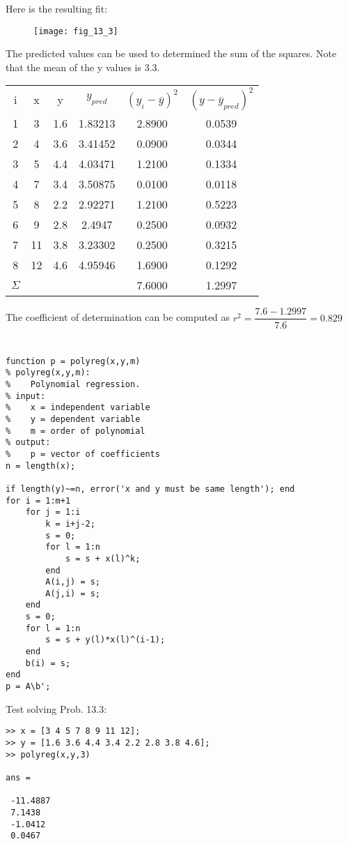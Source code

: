 \documentclass[../main.tex]{subfiles}
\begin{document}
	\bigbreak
Here is the resulting fit: 
	\bigbreak
	\begin{figure}[H]
		\texttt{[image: fig\_13\_3]}
		\label{fig:fig_13_3}
	\end{figure}
	\bigbreak
The predicted values can be used to determined the sum of the squares. Note that the mean
of the y values is 3.3.
	\bigbreak
	\begin{tabular}{cccccc}
	i&x&y&$y_{pred}$&$(y_i-\overline{y})^2$&$(y-\overline{y}_{pred})^2$\\
	1&3&1.6&1.83213&2.8900&0.0539\\
	2&4&3.6&3.41452&0.0900&0.0344\\
	3&5&4.4&4.03471&1.2100&0.1334\\
	4&7&3.4&3.50875&0.0100&0.0118\\
	5&8&2.2&2.92271&1.2100&0.5223\\
	6&9&2.8&2.4947&0.2500&0.0932\\
	7&11&3.8&3.23302&0.2500&0.3215\\
	8&12&4.6&4.95946&1.6900&0.1292\\
	$\Sigma$&&&&7.6000&1.2997\\
	\end{tabular}
	\bigbreak
The coefficient of determination can be computed as
	\bigbreak
$r^2=\dfrac{7.6-1.2997}{7.6}=0.829$
	\bigbreak



\section{}
\begin{lstlisting}[numbers=none]
function p = polyreg(x,y,m)
% polyreg(x,y,m):
%	 Polynomial regression.
% input:
%	 x = independent variable
%	 y = dependent variable
%	 m = order of polynomial
% output:
%	 p = vector of coefficients
n = length(x);

if length(y)~=n, error('x and y must be same length'); end
for i = 1:m+1
	for j = 1:i
		k = i+j-2;
		s = 0;
		for l = 1:n
			s = s + x(l)^k;
		end
		A(i,j) = s;
		A(j,i) = s;
	end
	s = 0;
	for l = 1:n
		s = s + y(l)*x(l)^(i-1);
	end
	b(i) = s;
end
p = A\b'; 
\end{lstlisting}
	\bigbreak
Test solving Prob. 13.3:
	\bigbreak
\begin{lstlisting}[numbers=none]
>> x = [3 4 5 7 8 9 11 12];
>> y = [1.6 3.6 4.4 3.4 2.2 2.8 3.8 4.6];
>> polyreg(x,y,3)

ans =

 -11.4887
 7.1438
 -1.0412
 0.0467 
\end{lstlisting}
	\bigbreak
\end{document}
